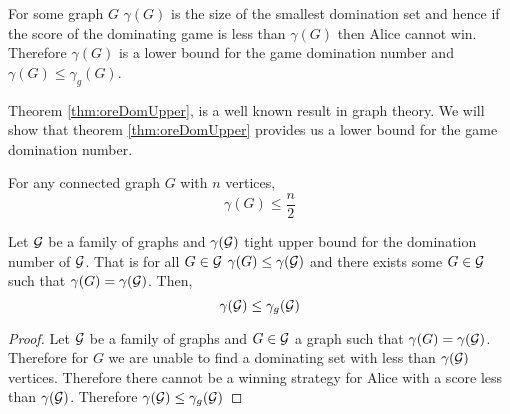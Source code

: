 %        
%
%    
%
%
%
%
%    
    
For some graph $G$ $\gamma(G)$ is the size of the smallest domination set and hence if the score of the dominating game is less than $\gamma(G)$ then Alice cannot win. Therefore $\gamma(G)$ is a lower bound for the game domination number and $\gamma(G)\leq\gamma_g(G)$. 

Theorem \ref{thm:oreDomUpper}, is a well known result in graph theory. We will show that theorem \ref{thm:oreDomUpper} provides us a lower bound for the game domination number.

\begin{theorem} \label{thm:oreDomUpper} 
    For any connected graph $G$ with $n$ vertices,     
    \[\gamma(G) \leq \frac{n}{2}\]
\end{theorem}
\begin{theorem}\label{thm:domlow}
    Let $\mathcal{G}$ be a family of graphs and $\gamma(\mathcal{G})$ tight upper bound for the domination number of $\mathcal{G}$. That is for all $G\in\mathcal{G}$ $\gamma(G)\leq\gamma(\mathcal{G})$ and there exists some $G\in\mathcal{G}$ such that $\gamma(G)=\gamma(\mathcal{G})$. Then,
    \[\gamma(\mathcal{G}) \leq  \gamma_g(\mathcal{G})\]
\end{theorem}

\begin{proof}
    Let $\mathcal{G}$ be a family of graphs and $G\in\mathcal{G}$ a graph such that $\gamma(G) = \gamma(\mathcal{G})$.
    Therefore for $G$ we are unable to find a dominating set with less than $ \gamma(\mathcal{G}) $ vertices.
    Therefore there cannot be a winning strategy for Alice with a score less than $\gamma(\mathcal{G})$.
    Therefore $\gamma(\mathcal{G}) \leq \gamma_g(\mathcal{G})$
\end{proof}

